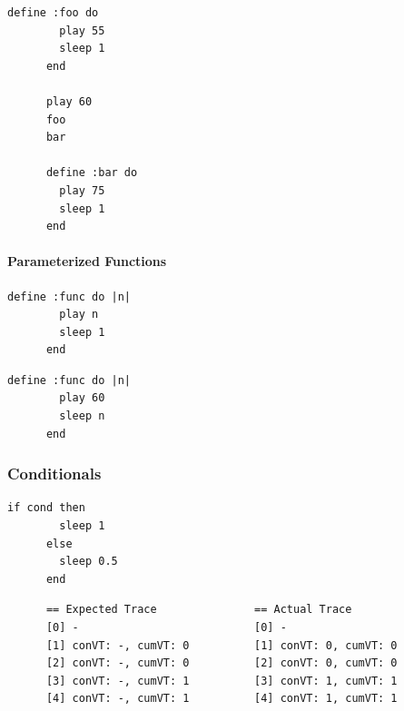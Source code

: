 \documentclass[11pt, abstracton, twoside]{scrartcl}
\begin{document}
\begin{minipage}{\textwidth}
	\begin{lstlisting}[style = sonicpi]
      define :foo do
        play 55
        sleep 1
      end

      play 60
      foo
      bar

      define :bar do
        play 75
        sleep 1
      end
	\end{lstlisting}
\end{minipage}

\paragraph{Parameterized Functions}
\begin{minipage}{\textwidth}
	\begin{lstlisting}[style = sonicpi]
      define :func do |n|
        play n
        sleep 1
      end
	\end{lstlisting}
\end{minipage}

\begin{minipage}{\textwidth}
	\begin{lstlisting}[style = sonicpi]
      define :func do |n|
        play 60
        sleep n
      end
	\end{lstlisting}
\end{minipage}

\subsubsection{Conditionals}
\begin{minipage}{\textwidth}
	\begin{lstlisting}[style = sonicpi]
      if cond then
        sleep 1
      else
        sleep 0.5
      end
	\end{lstlisting}
\end{minipage}
\begin{lstlisting}
      == Expected Trace               == Actual Trace
      [0] -                           [0] -
      [1] conVT: -, cumVT: 0          [1] conVT: 0, cumVT: 0
      [2] conVT: -, cumVT: 0          [2] conVT: 0, cumVT: 0
      [3] conVT: -, cumVT: 1          [3] conVT: 1, cumVT: 1
      [4] conVT: -, cumVT: 1          [4] conVT: 1, cumVT: 1
\end{lstlisting}
\end{document}

